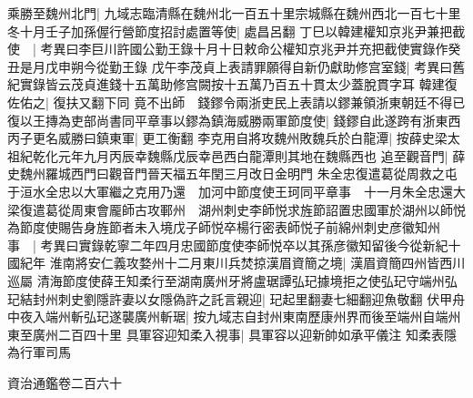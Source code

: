 乘勝至魏州北門|{
	九域志臨清縣在魏州北一百五十里宗城縣在魏州西北一百七十里}
冬十月壬子加孫偓行營節度招討處置等使|{
	處昌呂翻}
丁巳以韓建權知京兆尹兼把截使　|{
	考異曰李巨川許國公勤王錄十月十日敕命公權知京兆尹并充把截使實錄作癸丑是月戊申朔今從勤王錄}
戊午李茂貞上表請罪願得自新仍獻助修宫室錢|{
	考異曰舊紀實錄皆云茂貞進錢十五萬助修宫闕按十五萬乃百五十貫太少蓋脫貫字耳}
韓建復佐佑之|{
	復扶又翻下同}
竟不出師　錢鏐令兩浙吏民上表請以鏐兼領浙東朝廷不得已復以王摶為吏部尚書同平章事以鏐為鎮海威勝兩軍節度使|{
	錢鏐自此遂跨有浙東西}
丙子更名威勝曰鎮東軍|{
	更工衡翻}
李克用自將攻魏州敗魏兵於白龍潭|{
	按薛史梁太祖紀乾化元年九月丙辰幸魏縣戊辰幸邑西白龍潭則其地在魏縣西也}
追至觀音門|{
	薛史魏州羅城西門曰觀音門晉天福五年閏三月改日金明門}
朱全忠復遣葛從周救之屯于洹水全忠以大軍繼之克用乃還　加河中節度使王珂同平章事　十一月朱全忠還大梁復遣葛從周東會龎師古攻鄆州　湖州刺史李師悦求旌節詔置忠國軍於湖州以師悦為節度使賜告身旌節者未入境戊子師悦卒楊行密表師悦子前綿州刺史彦徽知州事　|{
	考異曰實錄乾寧二年四月忠國節度使李師悦卒以其孫彦徽知留後今從新紀十國紀年}
淮南將安仁義攻婺州十二月東川兵焚掠漢眉資簡之境|{
	漢眉資簡四州皆西川巡屬}
清海節度使薛王知柔行至湖南廣州牙將盧琚譚弘玘據境拒之使弘玘守端州弘玘結封州刺史劉隱許妻以女隱偽許之託言親迎|{
	玘起里翻妻七細翻迎魚敬翻}
伏甲舟中夜入端州斬弘玘遂襲廣州斬琚|{
	按九域志自封州東南歷康州界而後至端州自端州東至廣州二百四十里}
具軍容迎知柔入視事|{
	具軍容以迎新帥如承平儀注}
知柔表隱為行軍司馬

資治通鑑卷二百六十
